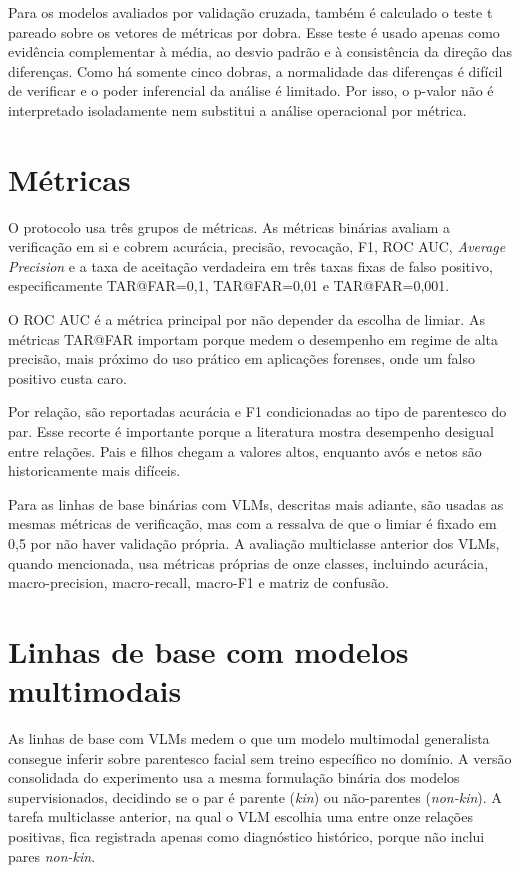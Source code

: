Para os modelos avaliados por validação cruzada, também é calculado o teste t pareado sobre os vetores de métricas por dobra. Esse teste é usado apenas como evidência complementar à média, ao desvio padrão e à consistência da direção das diferenças. Como há somente cinco dobras, a normalidade das diferenças é difícil de verificar e o poder inferencial da análise é limitado. Por isso, o p-valor não é interpretado isoladamente nem substitui a análise operacional por métrica.

\section{Métricas}

O protocolo usa três grupos de métricas. As métricas binárias avaliam a verificação em si e cobrem acurácia, precisão, revocação, F1, ROC AUC, \textit{Average Precision} e a taxa de aceitação verdadeira em três taxas fixas de falso positivo, especificamente TAR@FAR=0,1, TAR@FAR=0,01 e TAR@FAR=0,001.

O ROC AUC é a métrica principal por não depender da escolha de limiar. As métricas TAR@FAR importam porque medem o desempenho em regime de alta precisão, mais próximo do uso prático em aplicações forenses, onde um falso positivo custa caro.

Por relação, são reportadas acurácia e F1 condicionadas ao tipo de parentesco do par. Esse recorte é importante porque a literatura mostra desempenho desigual entre relações. Pais e filhos chegam a valores altos, enquanto avós e netos são historicamente mais difíceis.

Para as linhas de base binárias com VLMs, descritas mais adiante, são usadas as mesmas métricas de verificação, mas com a ressalva de que o limiar é fixado em 0,5 por não haver validação própria. A avaliação multiclasse anterior dos VLMs, quando mencionada, usa métricas próprias de onze classes, incluindo acurácia, macro-precision, macro-recall, macro-F1 e matriz de confusão.

\section{Linhas de base com modelos multimodais}

As linhas de base com VLMs medem o que um modelo multimodal generalista consegue inferir sobre parentesco facial sem treino específico no domínio. A versão consolidada do experimento usa a mesma formulação binária dos modelos supervisionados, decidindo se o par é parente (\textit{kin}) ou não-parentes (\textit{non-kin}). A tarefa multiclasse anterior, na qual o VLM escolhia uma entre onze relações positivas, fica registrada apenas como diagnóstico histórico, porque não inclui pares \textit{non-kin}.

